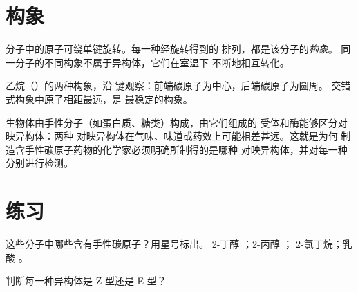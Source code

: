 \section{构象}

\begin{definition}[构象]\label{def:g12:stereochemistry:conformation}
分子中的原子可绕单键旋转。每一种经旋转得到的
排列，都是该分子的\emph{构象}。
同一分子的不同构象不属于异构体，它们在室温下
不断地相互转化。
\end{definition}

\begin{omfigure}

{\small 乙烷（）的两种构象，沿
 键观察：前端碳原子为中心，后端碳原子为圆周。
交错式构象中原子相距最远，是
最稳定的构象。}
\end{omfigure}

\begin{remark}[为何重要]\label{rem:g12:stereochemistry:matters}
生物体由手性分子（如蛋白质、糖类）构成，由它们组成的
受体和酶能够区分对映异构体：两种
对映异构体在气味、味道或药效上可能相差甚远。这就是为何
制造含手性碳原子药物的化学家必须明确所制得的是哪种
对映异构体，并对每一种分别进行检测。
\end{remark}

\section{练习}

\begin{exercise}[$\star$]\label{exo:g12:stereochemistry:1}
这些分子中哪些含有手性碳原子？用星号标出。
2-丁醇 ；2-丙醇 ；
2-氯丁烷；乳酸 。
\end{exercise}

\begin{exercise}[$\star$]\label{exo:g12:stereochemistry:2}
判断每一种异构体是 Z 型还是 E 型？
\begin{center}
 \qquad
{}
\end{center}
\end{exercise}

